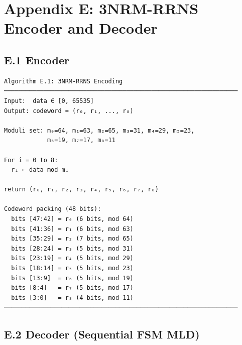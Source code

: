\documentclass[
  english,
  12pt,
]{report}
\begin{document}
\section{Appendix E: 3NRM-RRNS Encoder and
Decoder}\label{appendix-e-3nrm-rrns-encoder-and-decoder}

\subsection{E.1 Encoder}\label{e.1-encoder}

\begin{verbatim}
Algorithm E.1: 3NRM-RRNS Encoding
─────────────────────────────────────────────────────────────────
Input:  data ∈ [0, 65535]
Output: codeword = (r₀, r₁, ..., r₈)

Moduli set: m₀=64, m₁=63, m₂=65, m₃=31, m₄=29, m₅=23,
            m₆=19, m₇=17, m₈=11

For i = 0 to 8:
  rᵢ ← data mod mᵢ

return (r₀, r₁, r₂, r₃, r₄, r₅, r₆, r₇, r₈)

Codeword packing (48 bits):
  bits [47:42] = r₀ (6 bits, mod 64)
  bits [41:36] = r₁ (6 bits, mod 63)
  bits [35:29] = r₂ (7 bits, mod 65)
  bits [28:24] = r₃ (5 bits, mod 31)
  bits [23:19] = r₄ (5 bits, mod 29)
  bits [18:14] = r₅ (5 bits, mod 23)
  bits [13:9]  = r₆ (5 bits, mod 19)
  bits [8:4]   = r₇ (5 bits, mod 17)
  bits [3:0]   = r₈ (4 bits, mod 11)
─────────────────────────────────────────────────────────────────
\end{verbatim}

\subsection{E.2 Decoder (Sequential FSM
MLD)}\label{e.2-decoder-sequential-fsm-mld}
\end{document}
